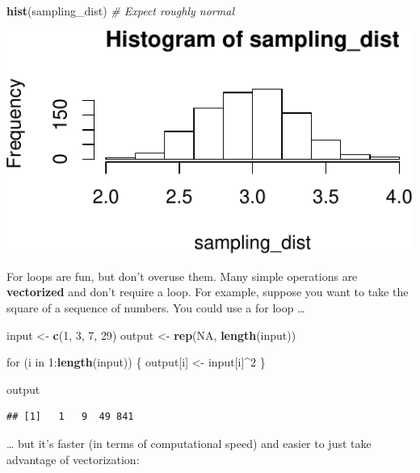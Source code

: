 \documentclass[12pt,oneside,openany]{book}
\newenvironment{Shaded}{\begin{snugshade}}{\end{snugshade}}
\newcommand{\KeywordTok}[1]{\textcolor[rgb]{0.13,0.29,0.53}{\textbf{{#1}}}}
\newcommand{\DecValTok}[1]{\textcolor[rgb]{0.00,0.00,0.81}{{#1}}}
\newcommand{\StringTok}[1]{\textcolor[rgb]{0.31,0.60,0.02}{{#1}}}
\newcommand{\CommentTok}[1]{\textcolor[rgb]{0.56,0.35,0.01}{\textit{{#1}}}}
\newcommand{\OtherTok}[1]{\textcolor[rgb]{0.56,0.35,0.01}{{#1}}}
\newcommand{\NormalTok}[1]{{#1}}
\begin{document}
\begin{Shaded}
\begin{Highlighting}[]
\KeywordTok{hist}\NormalTok{(sampling_dist)  }\CommentTok{# Expect roughly normal}
\end{Highlighting}
\end{Shaded}

\includegraphics{pdaps_files/figure-latex/sampling-dist-results-1.pdf}

For loops are fun, but don't overuse them. Many simple operations are
\textbf{vectorized} and don't require a loop. For example, suppose you
want to take the square of a sequence of numbers. You could use a for
loop \ldots{}

\begin{Shaded}
\begin{Highlighting}[]
\NormalTok{input <-}\StringTok{ }\KeywordTok{c}\NormalTok{(}\DecValTok{1}\NormalTok{, }\DecValTok{3}\NormalTok{, }\DecValTok{7}\NormalTok{, }\DecValTok{29}\NormalTok{)}
\NormalTok{output <-}\StringTok{ }\KeywordTok{rep}\NormalTok{(}\OtherTok{NA}\NormalTok{, }\KeywordTok{length}\NormalTok{(input))}

\NormalTok{for (i in }\DecValTok{1}\NormalTok{:}\KeywordTok{length}\NormalTok{(input)) \{}
  \NormalTok{output[i] <-}\StringTok{ }\NormalTok{input[i]^}\DecValTok{2}
\NormalTok{\}}

\NormalTok{output}
\end{Highlighting}
\end{Shaded}

\begin{verbatim}
## [1]   1   9  49 841
\end{verbatim}

\ldots{} but it's faster (in terms of computational speed) and easier to
just take advantage of vectorization:
\end{document}
